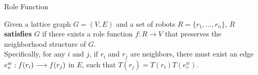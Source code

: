 \documentclass[10pt]{beamer}
\begin{document}

\begin{frame}{Role Function}
  \begin{definition}
    \small{Given a lattice graph $G=(V, E)$ and a set of robots $R = \{
    r_1, \ldots, r_n \}$, $R$ \textbf{satisfies} $G$ if
    there exists a role function $f: R \rightarrow V$ that preserves
    the neighborhood structure of $G$.
    \\
    Specifically, for any $i$ and $j$, if $r_i$ and $r_j$ are neighbors, 
    there must exist an edge
    $e_{v}^w: {f(r_i)}\overset{}{\longrightarrow}{f(r_j)}$ in $E$, such that
    $ T(r_j) = T(r_i) T(e_{v}^w)$.}
  \end{definition}
  
\end{frame}
\end{document}
